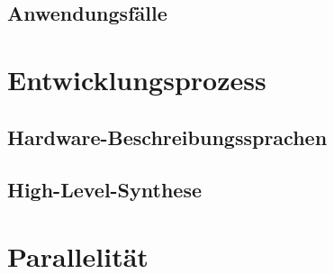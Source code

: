 \subsection{Anwendungsfälle}

\section{Entwicklungsprozess}

\subsection{Hardware-Beschreibungssprachen}

\subsection{High-Level-Synthese}

\section{Parallelität}

